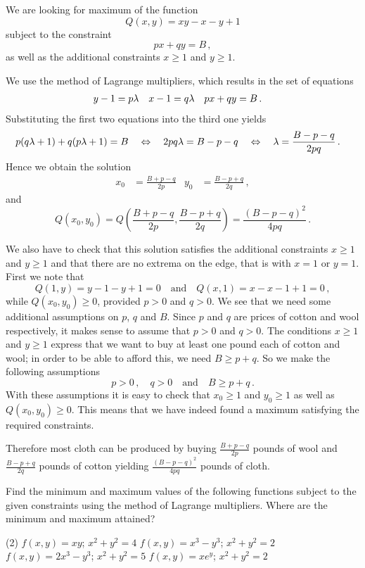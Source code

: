 \begin{solution}
We are looking for maximum of the function
\[
Q(x,y) = xy - x- y + 1
\]
subject to the constraint
\[
px + qy = B\,,
\]
as well as the additional constraints $x \geq 1$ and $y \geq 1$.

We use the method of Lagrange multipliers, which results in the set of equations
\begin{align*}
y - 1 &= p\lambda &
x - 1 &= q\lambda &
px + qy &= B\,.
\end{align*}
Substituting the first two equations into the third one yields
\begin{align*}
p(q\lambda + 1) + q(p\lambda + 1) &= B \quad\Leftrightarrow\quad
2pq\lambda = B - p - q \quad\Leftrightarrow\quad
\lambda = \frac{B-p-q}{2pq}\,.
\end{align*}
Hence we obtain the solution
\begin{align*}
x_0 &= \frac{B+p-q}{2p} &
y_0 &= \frac{B-p+q}{2q}\,,
\end{align*}
and
\[
Q(x_0, y_0) = Q\left(\frac{B+p-q}{2p}, \frac{B-p+q}{2q}\right) = \frac{\left(B-p-q\right)^2}{4pq}\,.
\]

We also have to check that this solution satisfies the additional constraints $x \geq 1$ and $y \geq 1$ and that there are no extrema on the edge, that is with $x=1$ or $y=1$. First we note that
\[
Q(1,y) = y-1-y+1 = 0 \quad\text{and}\quad Q(x, 1) = x-x-1+1 = 0\,,
\]
while $Q(x_0, y_0) \geq 0$, provided $p > 0$ and $q > 0$. We see that we need some additional assumptions on $p$, $q$ and $B$. Since $p$ and $q$ are prices of cotton and wool respectively, it makes sense to assume that $p > 0$ and $q > 0$. The conditions $x \geq 1$ and $y \geq 1$ express that we want to buy at least one pound each of cotton and wool; in order to be able to afford this, we need $B \geq p + q$. So we make the following assumptions
\[
p > 0\,,\quad q > 0 \quad\text{and}\quad B \geq p+q\,.
\]
With these assumptions it is easy to check that $x_0 \geq 1$ and $y_0 \geq 1$ as well as $Q(x_0, y_0) \geq 0$. This means that we have indeed found a maximum satisfying the required constraints.

Therefore most cloth can be produced by buying $\displaystyle \frac{B+p-q}{2p}$ pounds of wool and $\displaystyle \frac{B-p+q}{2q}$ pounds of cotton yielding $\displaystyle \frac{\left(B-p-q\right)^2}{4pq}$ pounds of cloth.
\end{solution}

\begin{question}
Find the minimum and maximum values of the following functions subject to the given constraints using the method of Lagrange multipliers. Where are the minimum and maximum attained?
\begin{tasks}(2)
\task
$f(x,y) = xy$; $x^2 + y^2 = 4$
\task
$f(x,y) = x^3 - y^3$; $x^2 + y^2 = 2$
\task
$f(x,y) = 2x^3 - y^3$; $x^2 + y^2 = 5$
\task
$f(x,y) = x e^y$; $x^2 + y^2 = 2$
\end{tasks}
\end{question}

